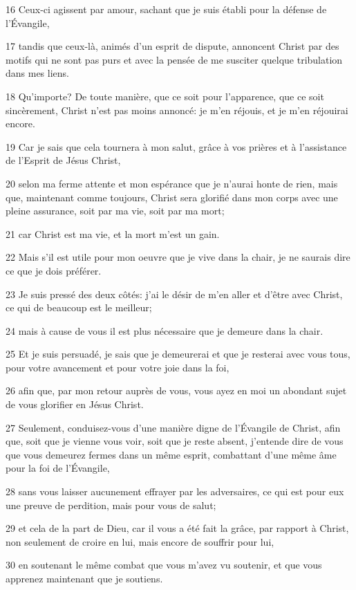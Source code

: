 \par 16 Ceux-ci agissent par amour, sachant que je suis établi pour la défense de l'Évangile,
\par 17 tandis que ceux-là, animés d'un esprit de dispute, annoncent Christ par des motifs qui ne sont pas purs et avec la pensée de me susciter quelque tribulation dans mes liens.
\par 18 Qu'importe? De toute manière, que ce soit pour l'apparence, que ce soit sincèrement, Christ n'est pas moins annoncé: je m'en réjouis, et je m'en réjouirai encore.
\par 19 Car je sais que cela tournera à mon salut, grâce à vos prières et à l'assistance de l'Esprit de Jésus Christ,
\par 20 selon ma ferme attente et mon espérance que je n'aurai honte de rien, mais que, maintenant comme toujours, Christ sera glorifié dans mon corps avec une pleine assurance, soit par ma vie, soit par ma mort;
\par 21 car Christ est ma vie, et la mort m'est un gain.
\par 22 Mais s'il est utile pour mon oeuvre que je vive dans la chair, je ne saurais dire ce que je dois préférer.
\par 23 Je suis pressé des deux côtés: j'ai le désir de m'en aller et d'être avec Christ, ce qui de beaucoup est le meilleur;
\par 24 mais à cause de vous il est plus nécessaire que je demeure dans la chair.
\par 25 Et je suis persuadé, je sais que je demeurerai et que je resterai avec vous tous, pour votre avancement et pour votre joie dans la foi,
\par 26 afin que, par mon retour auprès de vous, vous ayez en moi un abondant sujet de vous glorifier en Jésus Christ.
\par 27 Seulement, conduisez-vous d'une manière digne de l'Évangile de Christ, afin que, soit que je vienne vous voir, soit que je reste absent, j'entende dire de vous que vous demeurez fermes dans un même esprit, combattant d'une même âme pour la foi de l'Évangile,
\par 28 sans vous laisser aucunement effrayer par les adversaires, ce qui est pour eux une preuve de perdition, mais pour vous de salut;
\par 29 et cela de la part de Dieu, car il vous a été fait la grâce, par rapport à Christ, non seulement de croire en lui, mais encore de souffrir pour lui,
\par 30 en soutenant le même combat que vous m'avez vu soutenir, et que vous apprenez maintenant que je soutiens.

